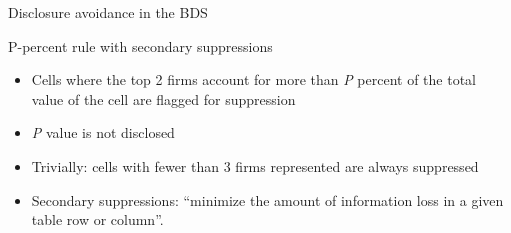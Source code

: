 \begin{frame}{Disclosure avoidance in the BDS}
\begin{block}{P-percent rule with secondary suppressions}
\begin{itemize}[<+->]
\item Cells where the top 2 firms account for more than \emph{P} percent of the total value of the cell are flagged for suppression
\item \emph{P} value is not disclosed
\item Trivially: cells with fewer than 3 firms represented are always suppressed
\item Secondary suppressions: ``minimize the amount of information loss in a given table row or column''.
\end{itemize}
\end{block}
\end{frame}


